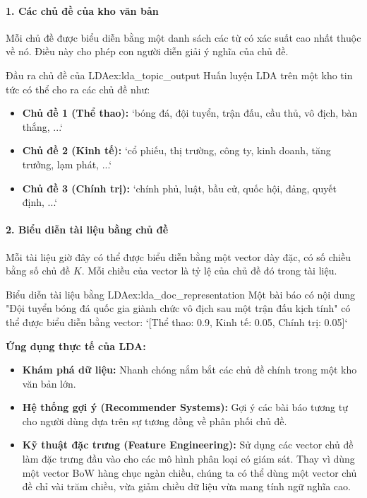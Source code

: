 \paragraph{1. Các chủ đề của kho văn bản}
Mỗi chủ đề được biểu diễn bằng một danh sách các từ có xác suất cao nhất thuộc về nó. Điều này cho phép con người diễn giải ý nghĩa của chủ đề.
\begin{example}{Đầu ra chủ đề của LDA}{ex:lda_topic_output}
    Huấn luyện LDA trên một kho tin tức có thể cho ra các chủ đề như:
    \begin{itemize}
        \item \textbf{Chủ đề 1 (Thể thao):} `bóng đá, đội tuyển, trận đấu, cầu thủ, vô địch, bàn thắng, ...`
        \item \textbf{Chủ đề 2 (Kinh tế):} `cổ phiếu, thị trường, công ty, kinh doanh, tăng trưởng, lạm phát, ...`
        \item \textbf{Chủ đề 3 (Chính trị):} `chính phủ, luật, bầu cử, quốc hội, đảng, quyết định, ...`
    \end{itemize}
\end{example}

\paragraph{2. Biểu diễn tài liệu bằng chủ đề}
Mỗi tài liệu giờ đây có thể được biểu diễn bằng một vector dày đặc, có số chiều bằng số chủ đề $K$. Mỗi chiều của vector là tỷ lệ của chủ đề đó trong tài liệu.
\begin{example}{Biểu diễn tài liệu bằng LDA}{ex:lda_doc_representation}
    Một bài báo có nội dung "Đội tuyển bóng đá quốc gia giành chức vô địch sau một trận đấu kịch tính" có thể được biểu diễn bằng vector:
    `[Thể thao: 0.9, Kinh tế: 0.05, Chính trị: 0.05]`
\end{example}

\textbf{Ứng dụng thực tế của LDA:}
\begin{itemize}
    \item \textbf{Khám phá dữ liệu:} Nhanh chóng nắm bắt các chủ đề chính trong một kho văn bản lớn.
    \item \textbf{Hệ thống gợi ý (Recommender Systems):} Gợi ý các bài báo tương tự cho người dùng dựa trên sự tương đồng về phân phối chủ đề.
    \item \textbf{Kỹ thuật đặc trưng (Feature Engineering):} Sử dụng các vector chủ đề làm đặc trưng đầu vào cho các mô hình phân loại có giám sát. Thay vì dùng một vector BoW hàng chục ngàn chiều, chúng ta có thể dùng một vector chủ đề chỉ vài trăm chiều, vừa giảm chiều dữ liệu vừa mang tính ngữ nghĩa cao.
\end{itemize}

